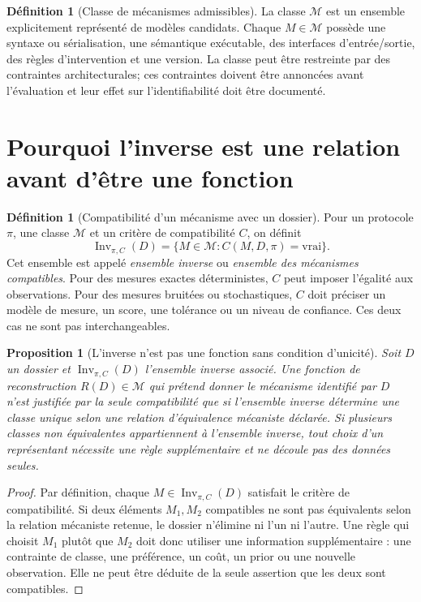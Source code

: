 \documentclass[11pt,oneside]{book}
\newtheorem{proposition}[theoreme]{Proposition}
\theoremstyle{definition}
\newtheorem{definition}[theoreme]{Définition}
\theoremstyle{remark}
\newcommand{\Mcal}{\mathcal M}
\newcommand{\1}{\mathbf 1}
\newcommand{\Inv}{\operatorname{Inv}}
\begin{document}
\begin{definition}[Classe de mécanismes admissibles]
La classe $\Mcal$ est un ensemble explicitement représenté de modèles candidats. Chaque $M\in\Mcal$ possède une syntaxe ou sérialisation, une sémantique exécutable, des interfaces d'entrée/sortie, des règles d'intervention et une version. La classe peut être restreinte par des contraintes architecturales; ces contraintes doivent être annoncées avant l'évaluation et leur effet sur l'identifiabilité doit être documenté.
\end{definition}

\section{Pourquoi l'inverse est une relation avant d'être une fonction}
\begin{definition}[Compatibilité d'un mécanisme avec un dossier]
Pour un protocole $\pi$, une classe $\Mcal$ et un critère de compatibilité $C$, on définit
\[
\Inv_{\pi,C}(D)=\{M\in\Mcal:C(M,D,\pi)=\mathrm{vrai}\}.
\]
Cet ensemble est appelé \emph{ensemble inverse} ou \emph{ensemble des mécanismes compatibles}. Pour des mesures exactes déterministes, $C$ peut imposer l'égalité aux observations. Pour des mesures bruitées ou stochastiques, $C$ doit préciser un modèle de mesure, un score, une tolérance ou un niveau de confiance. Ces deux cas ne sont pas interchangeables.
\end{definition}

\begin{proposition}[L'inverse n'est pas une fonction sans condition d'unicité]
Soit $D$ un dossier et $\Inv_{\pi,C}(D)$ l'ensemble inverse associé. Une fonction de reconstruction $R(D)\in\Mcal$ qui prétend donner \emph{le mécanisme identifié par $D$} n'est justifiée par la seule compatibilité que si l'ensemble inverse détermine une classe unique selon une relation d'équivalence mécaniste déclarée. Si plusieurs classes non équivalentes appartiennent à l'ensemble inverse, tout choix d'un représentant nécessite une règle supplémentaire et ne découle pas des données seules.
\end{proposition}
\begin{proof}
Par définition, chaque $M\in\Inv_{\pi,C}(D)$ satisfait le critère de compatibilité. Si deux éléments $M_1,M_2$ compatibles ne sont pas équivalents selon la relation mécaniste retenue, le dossier n'élimine ni l'un ni l'autre. Une règle qui choisit $M_1$ plutôt que $M_2$ doit donc utiliser une information supplémentaire : une contrainte de classe, une préférence, un coût, un prior ou une nouvelle observation. Elle ne peut être déduite de la seule assertion que les deux sont compatibles.\end{proof}
\end{document}
